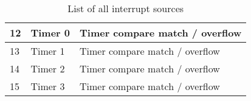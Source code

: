 \begin{table}[h]
\begin{tabular}{|l|l|l|}
        12                  & Timer 0             & Timer compare match / overflow  \\ \hline
        13                  & Timer 1             & Timer compare match / overflow  \\ \hline
        14                  & Timer 2             & Timer compare match / overflow  \\ \hline
        15                  & Timer 3             & Timer compare match / overflow  \\ \hline
    \end{tabular}
    \caption{List of all interrupt sources}
    \label{tab:intsources}
\end{table}
